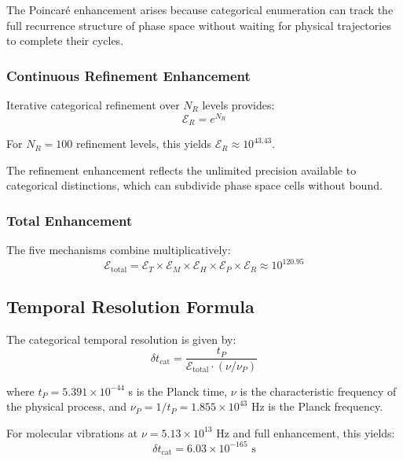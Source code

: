 \documentclass[twocolumn,10pt]{article}
\begin{document}
The Poincar\'{e} enhancement arises because categorical enumeration can track the full recurrence structure of phase space without waiting for physical trajectories to complete their cycles.

\subsubsection{Continuous Refinement Enhancement}

Iterative categorical refinement over $N_R$ levels provides:
\begin{equation}
    \mathcal{E}_R = e^{N_R}
\end{equation}

For $N_R = 100$ refinement levels, this yields $\mathcal{E}_R \approx 10^{43.43}$.

The refinement enhancement reflects the unlimited precision available to categorical distinctions, which can subdivide phase space cells without bound.

\subsubsection{Total Enhancement}

The five mechanisms combine multiplicatively:
\begin{equation}
    \mathcal{E}_{\text{total}} = \mathcal{E}_T \times \mathcal{E}_M \times \mathcal{E}_H \times \mathcal{E}_P \times \mathcal{E}_R \approx 10^{120.95}
\end{equation}

\subsection{Temporal Resolution Formula}

The categorical temporal resolution is given by:
\begin{equation}
    \delta t_{\text{cat}} = \frac{t_P}{\mathcal{E}_{\text{total}} \cdot (\nu/\nu_P)}
\end{equation}

where $t_P = 5.391 \times 10^{-44}$ s is the Planck time, $\nu$ is the characteristic frequency of the physical process, and $\nu_P = 1/t_P = 1.855 \times 10^{43}$ Hz is the Planck frequency.

For molecular vibrations at $\nu = 5.13 \times 10^{13}$ Hz and full enhancement, this yields:
\begin{equation}
    \delta t_{\text{cat}} = 6.03 \times 10^{-165} \text{ s}
\end{equation}
\end{document}
